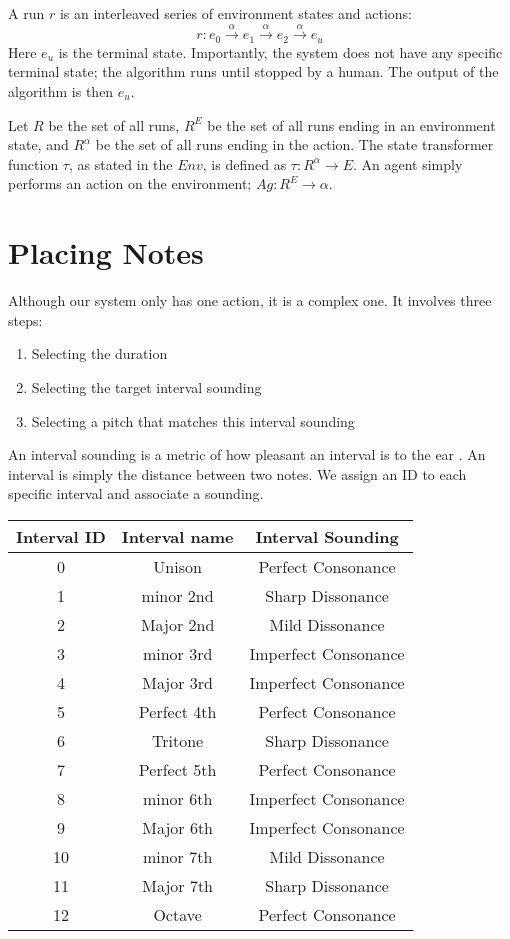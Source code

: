 \documentclass[12pt]{article}
\begin{document}
	A run $r$ is an interleaved series of environment states and actions:
	$$r: e_0 \xrightarrow{\alpha} e_1 \xrightarrow{\alpha} e_2 \xrightarrow{\alpha} e_u$$
	Here $e_u$ is the terminal state. Importantly, the system does not have any specific terminal state; the algorithm runs until stopped by a human. The output of the algorithm is then $e_u$.
	
	Let $R$ be the set of all runs, $R^E$ be the set of all runs ending in an environment state, and $R^\alpha$ be the set of all runs ending in the action. The state transformer function $\tau$, as stated in the $Env$, is defined as $\tau: R^\alpha \to E$. An agent simply performs an action on the environment; $Ag: R^E \to \alpha$.
	
	\section{Placing Notes}
	Although our system only has one action, it is a complex one. It involves three steps:
	\begin{enumerate}
		\item Selecting the duration
		\item Selecting the target interval sounding
		\item Selecting a pitch that matches this interval sounding
	\end{enumerate}

	An interval sounding is a metric of how pleasant an interval is to the ear \cite{jones1974music}. An interval is simply the distance between two notes. We assign an ID to each specific interval and associate a sounding.
	
	\begin{tabular}{c|c|c}
		Interval ID & Interval name & Interval Sounding \\\hline
		0 & Unison & Perfect Consonance \\
		1 & minor 2nd & Sharp Dissonance \\
		2 & Major 2nd & Mild Dissonance \\
		3 & minor 3rd & Imperfect Consonance \\
		4 & Major 3rd & Imperfect Consonance \\
		5 & Perfect 4th & Perfect Consonance \\
		6 & Tritone & Sharp Dissonance \\
		7 & Perfect 5th & Perfect Consonance \\
		8 & minor 6th & Imperfect Consonance \\
		9 & Major 6th & Imperfect Consonance \\
		10 & minor 7th & Mild Dissonance \\
		11 & Major 7th & Sharp Dissonance \\
		12 & Octave & Perfect Consonance \\
	\end{tabular}
\end{document}

